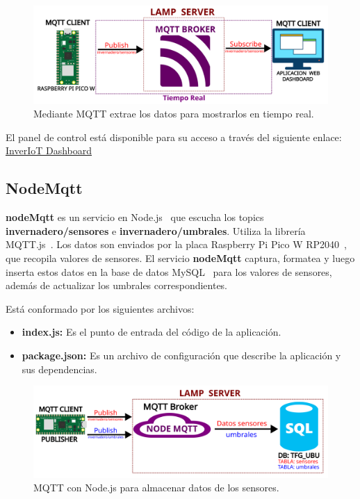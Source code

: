 \begin{figure}[h]
    \centering
    \includegraphics[width=1\textwidth]{img/diagramas/mqtt_dashboard_TiempoReal.png}
    \caption{Mediante MQTT extrae los datos para mostrarlos en tiempo real.} \label{Img:Dashboard_diagrama_TiempoReal}
\end{figure}

El panel de control está disponible para su acceso a través del siguiente enlace: \href{http://www.inveriot.com}{InverIoT Dashboard}



\subsection{NodeMqtt}\label{proyecto:NodeMqtt}
\textbf{nodeMqtt} es un servicio en Node.js~\cite{misc:Nodejs} que escucha los topics \textbf{invernadero/sensores} e \textbf{invernadero/umbrales}. Utiliza la librería MQTT.js~\cite{misc:MQTTjs}. Los datos son enviados por la placa Raspberry Pi Pico W RP2040~\cite{misc:RPiPicoW}, que recopila valores de sensores. El servicio \textbf{nodeMqtt} captura, formatea y luego inserta estos datos en la base de datos MySQL~\cite{misc:Mysql} para los valores de sensores, además de actualizar los umbrales correspondientes.

Está conformado por los siguientes archivos:

\begin{itemize}
	\item \textbf{index.js:}
		Es el punto de entrada del código de la aplicación.
	\item \textbf{package.json:}
		Es un archivo de configuración que describe la aplicación y sus dependencias.
\end{itemize}

\begin{figure}[h]
	\centering
	\includegraphics[width=1\textwidth]{img/diagramas/mqtt_nodeMqtt.png}
	\caption{MQTT con Node.js para almacenar datos de los sensores.}
\end{figure}

